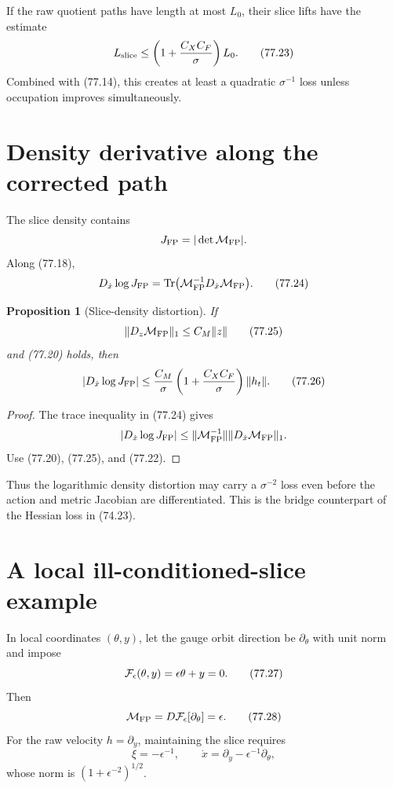 \documentclass[11pt]{article}
\newtheorem{proposition}[theorem]{Proposition}
\theoremstyle{remark}
\begin{document}
If the raw quotient paths have length at most \(L_0\), their slice
lifts have the estimate
\[
 L_{\rm slice}
 \leq
 \left(1+\frac{C_XC_F}{\sigma}\right)L_0.              \tag{77.23}
\]
Combined with (77.14), this creates at least a quadratic
\(\sigma^{-1}\) loss unless occupation improves simultaneously.

\section{Density derivative along the corrected path}

The slice density contains
\[
 J_{\rm FP}=|\det{\cal M}_{\rm FP}|.
\]
Along (77.18),
\[
 D_{\dot x}\log J_{\rm FP}
 =
 \operatorname{Tr}\bigl(
 {\cal M}_{\rm FP}^{-1}D_{\dot x}{\cal M}_{\rm FP}
 \bigr).                                              \tag{77.24}
\]

\begin{proposition}[Slice-density distortion]
\label{prop:v15v77-density}
If
\[
 \|D_z{\cal M}_{\rm FP}\|_1\leq C_M\|z\|              \tag{77.25}
\]
and (77.20) holds, then
\[
 |D_{\dot x}\log J_{\rm FP}|
 \leq
 \frac{C_M}{\sigma}
 \left(1+\frac{C_XC_F}{\sigma}\right)\|h_t\|.          \tag{77.26}
\]
\end{proposition}

\begin{proof}
The trace inequality in (77.24) gives
\[
 |D_{\dot x}\log J_{\rm FP}|
 \leq\|{\cal M}_{\rm FP}^{-1}\|
 \|D_{\dot x}{\cal M}_{\rm FP}\|_1.
\]
Use (77.20), (77.25), and (77.22).
\end{proof}

Thus the logarithmic density distortion may carry a
\(\sigma^{-2}\) loss even before the action and metric Jacobian are
differentiated.  This is the bridge counterpart of the Hessian
loss in (74.23).

\section{A local ill-conditioned-slice example}

\begin{counterexample}
\label{cnt:v15v77-slice}
In local coordinates \((\theta,y)\), let the gauge orbit direction
be \(\partial_\theta\) with unit norm and impose
\[
 {\cal F}_\epsilon(\theta,y)=\epsilon\theta+y=0.       \tag{77.27}
\]
Then
\[
 {\cal M}_{\rm FP}=
 D{\cal F}_\epsilon[\partial_\theta]=\epsilon.         \tag{77.28}
\]
For the raw velocity \(h=\partial_y\), maintaining the slice
requires
\[
 \xi=-\epsilon^{-1},\qquad
 \dot x=\partial_y-\epsilon^{-1}\partial_\theta,      \tag{77.29}
\]
whose norm is \((1+\epsilon^{-2})^{1/2}\).
\end{counterexample}
\end{document}
